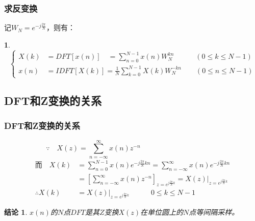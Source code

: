 \documentclass[notheorems,compress,mathserif,table]{beamer}
\newtheorem{dablock}{}
\newtheorem{jielun}{结论}
\begin{document}
\begin{frame}[shrink]\frametitle{求反变换}%
记$W_N = e^{-j\frac{2\pi}{N}}$，则有：
\begin{dablock}
    \begin{equation*}
           \left\{ \begin{aligned}
               X(k) &=  DFT[x(n)]\quad = \sum_{n=0}^{N-1}x(n) W_N^{kn} \quad\quad\quad (0 \leq k \leq N-1) \\
               x(n) &= IDFT[X(k)] = \frac{1}{N}\sum_{k=0}^{N-1}X(k)W_N^{-kn} \quad\quad (0 \leq n \leq N-1)
           \end{aligned} \right.
    \end{equation*}
    \vspace{0.2cm}
\end{dablock}    
\end{frame}
%
%
%



\subsection{DFT和Z变换的关系}

\begin{frame}[shrink]\frametitle{DFT和Z变换的关系}%
$$  \because \quad  X(z) = \sum_{n=-\infty}^{\infty}x(n)z^{-n}\qquad\qquad\quad\quad\quad\quad\quad\quad\quad $$
\begin{equation*}
\begin{split}
\mbox{而}\quad  X(k) &= \sum_{n=0}^{N-1}x(n)e^{-j\frac{2\pi}{N}kn}
                      = \sum_{n=-\infty}^{\infty}x(n)e^{-j\frac{2\pi}{N}kn}\\
                     &= \left[\sum_{n=-\infty}^{\infty}x(n) z^{-n}\right]_{z = e^{j\frac{2\pi}{N}k}} =X(z)\Big|_{z = e^{j\frac{2\pi}{N}k}}   \\
\therefore  X(k)     &= X(z)\Big|_{z = e^{j\frac{2\pi}{N}k}} \quad\quad\quad 0 \leq k \leq N-1
\end{split}
\end{equation*}
\begin{jielun}
{\heiti $x(n)$的$N$点$DFT$是其$Z$变换$X(z)$在单位圆上的$N$点等间隔采样。}
\end{jielun}

\end{frame}
%
%
%
\end{document}
